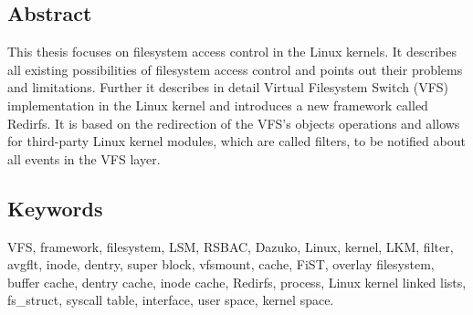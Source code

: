 \begin{titlepage}
	\subsection*{Abstract}
	This thesis focuses on filesystem access control in the Linux kernels. It
	describes all existing possibilities of filesystem access control and points
	out their problems and limitations. Further it describes in detail Virtual
	Filesystem Switch (VFS) implementation in the Linux kernel and introduces a
	new framework called Redirfs. It is based on the redirection of the VFS's
	objects operations and allows for third-party Linux kernel modules, which are
	called filters, to be notified about all events in the VFS layer.

	\vspace{3cm}
	\subsection*{Keywords}
	VFS, framework, filesystem, LSM, RSBAC, Dazuko, Linux, kernel, LKM, filter,
	avgflt, inode, dentry, super block, vfsmount, cache, FiST, overlay filesystem,
	buffer cache, dentry cache, inode cache, Redirfs, process, Linux kernel linked
	lists, fs\_struct, syscall table, interface, user space, kernel space.
\end{titlepage}

